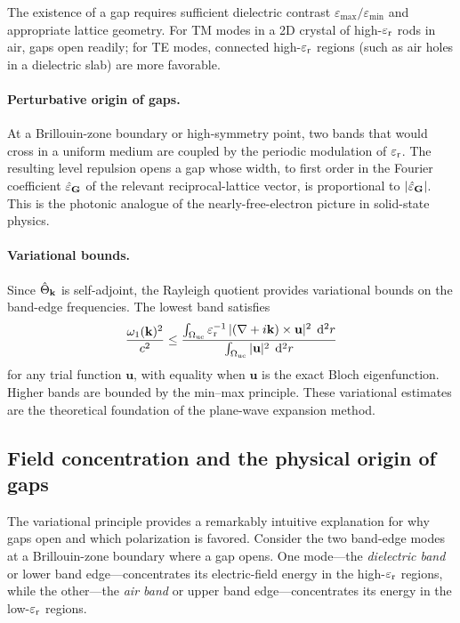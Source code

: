 The existence of a gap requires sufficient dielectric contrast
$\varepsilon_{\max}/\varepsilon_{\min}$ and appropriate lattice geometry. For TM
modes in a 2D crystal of high-$\varepsilon_{\mathrm{r}}$ rods in air, gaps open readily;
for TE modes, connected high-$\varepsilon_{\mathrm{r}}$ regions (such as air holes in a
dielectric slab) are more favorable.

\paragraph{Perturbative origin of gaps.}
At a Brillouin-zone boundary or high-symmetry point, two bands that would
cross in a uniform medium are coupled by the periodic modulation of
$\varepsilon_{\mathrm{r}}$. The resulting level repulsion opens a gap whose width, to
first order in the Fourier coefficient $\hat{\varepsilon}_{\mathbf{G}}$ of the
relevant reciprocal-lattice vector, is proportional to
$|\hat{\varepsilon}_{\mathbf{G}}|$. This is the photonic analogue of the
nearly-free-electron picture in solid-state physics.

\paragraph{Variational bounds.}
Since $\hat{\Theta}_{\mathbf{k}}$ is self-adjoint, the Rayleigh quotient provides
variational bounds on the band-edge frequencies. The lowest band satisfies
\begin{equation}
 \frac{\omega_1(\mathbf{k})^2}{c^2}
 \le \frac{\int_{\Omega_{\mathrm{uc}}}
 \varepsilon_{\mathrm{r}}^{-1}\,|(\nabla + i\mathbf{k})\times\mathbf{u}|^2\;\mathop{}\!\mathrm{d}^2 r}
 {\int_{\Omega_{\mathrm{uc}}} |\mathbf{u}|^2\;\mathop{}\!\mathrm{d}^2 r}
 \label{eq:variational-band}
\end{equation}
for any trial function $\mathbf{u}$, with equality when $\mathbf{u}$
is the exact Bloch eigenfunction. Higher bands are bounded by the
min--max principle. These variational estimates are the theoretical
foundation of the plane-wave expansion method.


\subsection{Field concentration and the physical origin of gaps}
\label{ssec:field-concentration}

The variational principle provides a remarkably intuitive explanation for
why gaps open and which polarization is favored. Consider the two
band-edge modes at a Brillouin-zone boundary where a gap opens. One
mode---the \emph{dielectric band} or lower band edge---concentrates its
electric-field energy in the high-$\varepsilon_{\mathrm{r}}$ regions, while the other---the
\emph{air band} or upper band edge---concentrates its energy in the
low-$\varepsilon_{\mathrm{r}}$ regions.

